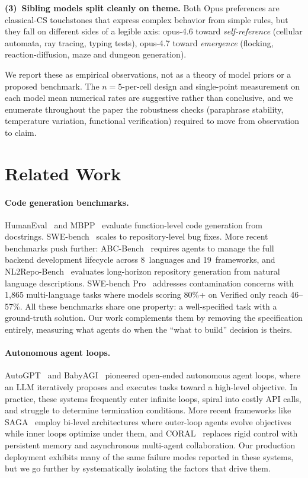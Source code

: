 \documentclass{article}
\begin{document}
\textbf{(3)~Sibling models split cleanly on theme.} Both Opus
preferences are classical-CS touchstones that express complex
behavior from simple rules, but they fall on different sides of
a legible axis: opus-4.6 toward \emph{self-reference}
(cellular automata, ray tracing, typing tests), opus-4.7 toward
\emph{emergence} (flocking, reaction-diffusion, maze and
dungeon generation).

We report these as empirical observations, not as a theory of
model priors or a proposed benchmark. The $n=5$-per-cell
design and single-point measurement on each model mean
numerical rates are suggestive rather than conclusive, and
we enumerate throughout the paper the robustness checks
(paraphrase stability, temperature variation, functional
verification) required to move from observation to claim.

\section{Related Work}
\label{sec:related}

\paragraph{Code generation benchmarks.}
HumanEval~\citep{chen2021codex} and MBPP~\citep{austin2021mbpp}
evaluate function-level code generation from docstrings.
SWE-bench~\citep{jimenez2024swebench} scales to repository-level
bug fixes. More recent benchmarks push further:
ABC-Bench~\citep{zhang2026abcbench} requires agents to manage the
full backend development lifecycle across 8~languages and
19~frameworks, and NL2Repo-Bench~\citep{nl2repobench2025} evaluates
long-horizon repository generation from natural language
descriptions. SWE-bench Pro~\citep{swebenchpro2026} addresses
contamination concerns with 1,865 multi-language tasks where
models scoring 80\%+ on Verified only reach 46--57\%.
All these benchmarks share one property: a well-specified task
with a ground-truth solution. Our work complements them by
removing the specification entirely, measuring what agents do when
the ``what to build'' decision is theirs.

\paragraph{Autonomous agent loops.}
AutoGPT~\citep{significantgravitas2023autogpt} and
BabyAGI~\citep{nakajima2023babyagi} pioneered open-ended
autonomous agent loops, where an LLM iteratively proposes and
executes tasks toward a high-level objective. In practice, these
systems frequently enter infinite loops, spiral into costly API
calls, and struggle to determine termination conditions.
More recent frameworks like SAGA~\citep{saga2025goalevolving}
employ bi-level architectures where outer-loop agents evolve
objectives while inner loops optimize under them, and
CORAL~\citep{coral2026multiagent} replaces rigid control with
persistent memory and asynchronous multi-agent collaboration.
Our production deployment exhibits many of the same failure modes
reported in these systems, but we go further by systematically
isolating the factors that drive them.
\end{document}
